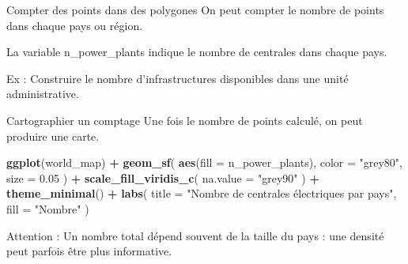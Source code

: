 \documentclass[
  10pt,
  ignorenonframetext,
]{beamer}
\newenvironment{Shaded}{\begin{snugshade}}{\end{snugshade}}
\newcommand{\AttributeTok}[1]{\textcolor[rgb]{0.13,0.29,0.53}{#1}}
\newcommand{\FloatTok}[1]{\textcolor[rgb]{0.00,0.00,0.81}{#1}}
\newcommand{\FunctionTok}[1]{\textcolor[rgb]{0.13,0.29,0.53}{\textbf{#1}}}
\newcommand{\NormalTok}[1]{#1}
\newcommand{\OtherTok}[1]{\textcolor[rgb]{0.56,0.35,0.01}{#1}}
\newcommand{\SpecialCharTok}[1]{\textcolor[rgb]{0.81,0.36,0.00}{\textbf{#1}}}
\newcommand{\StringTok}[1]{\textcolor[rgb]{0.31,0.60,0.02}{#1}}
\begin{document}
\begin{frame}[fragile]{Compter des points dans des polygones}
\label{compter-des-points-dans-des-polygones}
On peut compter le nombre de points dans chaque pays ou région.

\begin{Shaded}
\end{Shaded}

La variable n\_power\_plants indique le nombre de centrales dans chaque
pays.

Ex : Construire le nombre d'infrastructures disponibles dans une unité
administrative.
\end{frame}

\begin{frame}[fragile]{Cartographier un comptage}
\label{cartographier-un-comptage}
Une fois le nombre de points calculé, on peut produire une carte.

\begin{Shaded}
\begin{Highlighting}[]
\FunctionTok{ggplot}\NormalTok{(world\_map) }\SpecialCharTok{+}
  \FunctionTok{geom\_sf}\NormalTok{(}
    \FunctionTok{aes}\NormalTok{(}\AttributeTok{fill =}\NormalTok{ n\_power\_plants),}
    \AttributeTok{color =} \StringTok{"grey80"}\NormalTok{,}
    \AttributeTok{size =} \FloatTok{0.05}
\NormalTok{  ) }\SpecialCharTok{+}
  \FunctionTok{scale\_fill\_viridis\_c}\NormalTok{(}
    \AttributeTok{na.value =} \StringTok{"grey90"}
\NormalTok{  ) }\SpecialCharTok{+}
  \FunctionTok{theme\_minimal}\NormalTok{() }\SpecialCharTok{+}
  \FunctionTok{labs}\NormalTok{(}
    \AttributeTok{title =} \StringTok{"Nombre de centrales électriques par pays"}\NormalTok{,}
    \AttributeTok{fill =} \StringTok{"Nombre"}
\NormalTok{  )}
\end{Highlighting}
\end{Shaded}

Attention : Un nombre total dépend souvent de la taille du pays : une
densité peut parfois être plus informative.
\end{frame}
\end{document}
